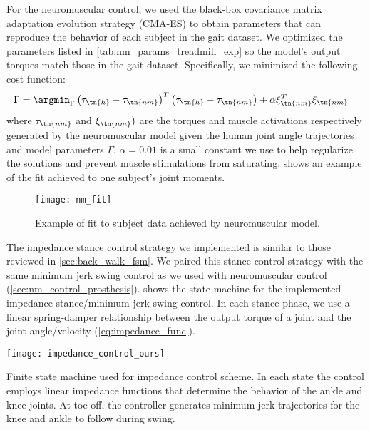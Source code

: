 For the neuromuscular control, we used the black-box covariance matrix
adaptation evolution strategy (CMA-ES) \citep{hansen2006cma} to obtain
parameters that can reproduce the behavior of each subject in the gait dataset.
We optimized the parameters listed in \cref{tab:nm_params_treadmill_exp} so the
model's output torques match those in the gait dataset. Specifically, we
minimized the following cost function:
\begin{align}
    \Gamma &= \argmin_\Gamma \left(\tau_\tn{h} - \tau_\tn{nm} \right)^T
    \left(\tau_\tn{h} - \tau_\tn{nm} \right) + \alpha \xi_\tn{nm}^T \xi_\tn{nm}
\end{align}
where $\tau_\tn{nm}$ and  $\xi_\tn{nm})$ are the torques and muscle activations
respectively generated by the neuromuscular model given the human joint angle
trajectories and model parameters $\Gamma$. $\alpha = 0.01$ is a small constant
we use to help regularize the solutions and prevent muscle stimulations from
saturating.  shows an example of the fit achieved to
one subject's joint moments.
\begin{figure}[b]
    \centering 
    \texttt{[image: nm\_fit]}
    \caption{Example of fit to subject data achieved by neuromuscular
    model.}\label{fig:treadmill_nm_fit}
\end{figure}

The impedance stance control strategy we implemented is similar to those
reviewed in \cref{sec:back_walk_fsm}. We paired this stance control strategy
with the same minimum jerk swing control as we used with neuromuscular control
(\cref{sec:nm_control_prosthesis}).  shows the
state machine for the implemented impedance stance/minimum-jerk swing control.
In each stance phase, we use a linear spring-damper relationship between the
output torque of a joint and the joint angle/velocity
(\cref{eq:impedance_func}).
\begin{marginfigure}
    \centering
    \texttt{[image: impedance\_control\_ours]}
    \caption[Finite state machine used for impedance control scheme]{Finite
    state machine used for impedance control scheme. In each state the control
    employs linear impedance functions that determine the behavior of the ankle
    and knee joints. At toe-off, the controller generates minimum-jerk
    trajectories for the knee and ankle to follow during
    swing.}\label{fig:impedance_control_ours}
\end{marginfigure}

